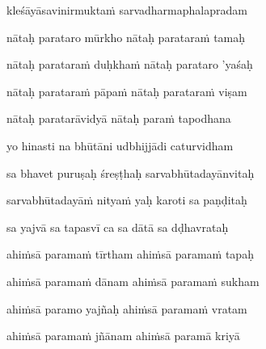 kleśāyāsavinirmukta\.m sarvadharmaphalapradam \veg\dontdisplaylinenum

nātaḥ parataro mūrkho nātaḥ paratara\.m tamaḥ\thinspace{\dandab} \dontdisplaylinenum

nātaḥ paratara\.m duḥkha\.m nātaḥ parataro 'yaśaḥ \veg\dontdisplaylinenum

nātaḥ paratara\.m pāpa\.m nātaḥ paratara\.m viṣam\thinspace{\dandab} \dontdisplaylinenum

nātaḥ paratarāvidyā nātaḥ para\.m tapodhana \veg\dontdisplaylinenum

yo hinasti na bhūtāni udbhijjādi caturvidham\thinspace{\dandab} \dontdisplaylinenum

sa bhavet puruṣaḥ śreṣṭhaḥ sarvabhūtadayānvitaḥ \veg\dontdisplaylinenum

sarvabhūtadayā\.m nitya\.m yaḥ karoti sa paṇḍitaḥ\thinspace{\dandab} \dontdisplaylinenum

sa yajvā sa tapasvī ca sa dātā sa dḍhavrataḥ \veg\dontdisplaylinenum

ahi\.msā parama\.m tīrtham ahi\.msā parama\.m tapaḥ\thinspace{\dandab} \dontdisplaylinenum

ahi\.msā parama\.m dānam ahi\.msā parama\.m sukham \veg\dontdisplaylinenum

ahi\.msā paramo yajñaḥ ahi\.msā parama\.m vratam\thinspace{\dandab} \dontdisplaylinenum

ahi\.msā parama\.m jñānam ahi\.msā paramā kriyā \veg\dontdisplaylinenum

